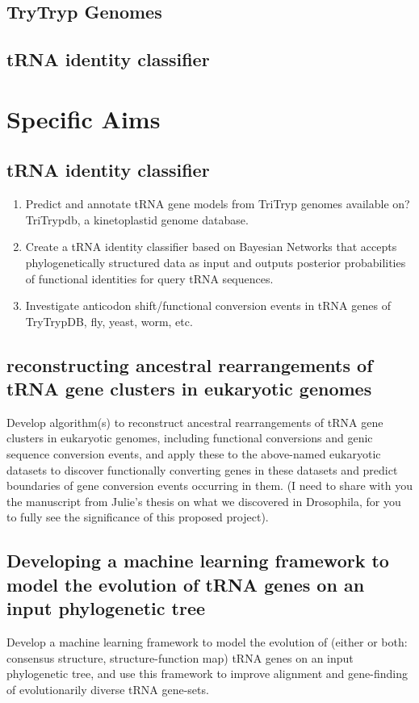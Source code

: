 \documentclass[
10pt, %
a4paper, %
oneside, %
headinclude,footinclude, %
BCOR5mm, %
]{scrartcl}
\begin{document}
\subsection{TryTryp Genomes}	
\subsection{tRNA identity classifier}

\section{Specific Aims}
\subsection{tRNA identity classifier}
 
\begin{enumerate}[noitemsep] %
\item Predict and annotate tRNA gene models from TriTryp genomes available on? TriTrypdb, a kinetoplastid genome database. 
\item Create a tRNA identity classifier based on Bayesian Networks that accepts phylogenetically structured data as input and outputs posterior probabilities of functional identities for query tRNA sequences.
\item Investigate anticodon shift/functional conversion events in tRNA genes of TryTrypDB, fly, yeast, worm, etc. 

\end{enumerate} 
\subsection{reconstructing ancestral rearrangements of tRNA gene clusters in eukaryotic genomes}
Develop algorithm(s) to reconstruct ancestral rearrangements of tRNA gene clusters in eukaryotic genomes, including functional conversions and genic sequence conversion events, and apply these to the above-named eukaryotic datasets to discover functionally converting genes in these datasets and predict boundaries of gene conversion events occurring in them. (I need to share with you the manuscript from Julie’s thesis on what we discovered in Drosophila, for you to fully see the significance of this proposed project). 
\subsection{Developing a machine learning framework to model the evolution of tRNA genes on an input phylogenetic tree}
Develop a machine learning framework to model the evolution of (either or both: {consensus structure, structure-function map}) tRNA genes on an input phylogenetic tree, and use this framework to improve alignment and gene-finding of evolutionarily diverse tRNA gene-sets.
\end{document}

